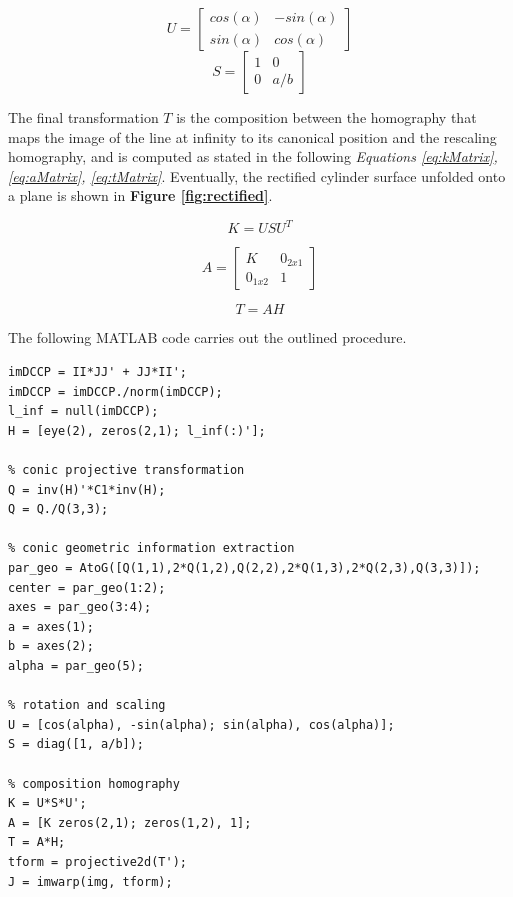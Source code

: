 \documentclass[12pt,a4paper]{article}
\begin{document}
\begin{equation}
    U = 
    \begin{bmatrix}
    cos(\alpha) & -sin(\alpha)\\
    sin(\alpha) & cos(\alpha)
    \end{bmatrix}
    \label{eq:uMatrix}
\end{equation}
\bigskip
\begin{equation}
    S = 
    \begin{bmatrix}
    1 & 0\\
    0 & a/b
    \end{bmatrix}
    \label{eq:sMatrix}
\end{equation}
\bigskip

The final transformation $T$ is the composition between the homography that maps the image of the line at infinity to its canonical position and the rescaling homography, and is computed as stated in the following \textit{Equations \ref{eq:kMatrix}, \ref{eq:aMatrix}, \ref{eq:tMatrix}}. Eventually, the rectified cylinder surface unfolded onto a plane is shown in \textbf{Figure \ref{fig:rectified}}.

\begin{equation}
    K = USU^T
    \label{eq:kMatrix}
\end{equation}

\begin{equation}
    A = 
    \begin{bmatrix}
    K & 0_{2x1}\\
    0_{1x2} & 1
    \end{bmatrix}
    \label{eq:aMatrix}
\end{equation}

\begin{equation}
    T = AH
    \label{eq:tMatrix}
\end{equation}
\bigskip

The following MATLAB code carries out the outlined procedure.

\begin{verbatim}
imDCCP = II*JJ' + JJ*II';
imDCCP = imDCCP./norm(imDCCP);
l_inf = null(imDCCP);
H = [eye(2), zeros(2,1); l_inf(:)'];

% conic projective transformation
Q = inv(H)'*C1*inv(H);
Q = Q./Q(3,3);

% conic geometric information extraction
par_geo = AtoG([Q(1,1),2*Q(1,2),Q(2,2),2*Q(1,3),2*Q(2,3),Q(3,3)]);
center = par_geo(1:2);
axes = par_geo(3:4);
a = axes(1);
b = axes(2);
alpha = par_geo(5);

% rotation and scaling
U = [cos(alpha), -sin(alpha); sin(alpha), cos(alpha)];
S = diag([1, a/b]);

% composition homography
K = U*S*U';
A = [K zeros(2,1); zeros(1,2), 1];
T = A*H;
tform = projective2d(T');
J = imwarp(img, tform);
\end{verbatim}
\end{document}
